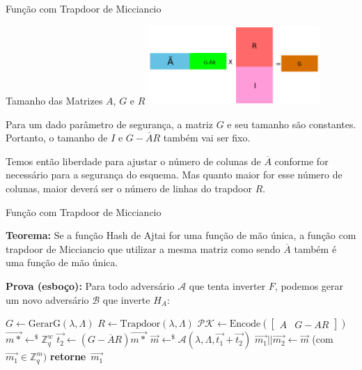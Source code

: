 \documentclass{beamer}
\begin{document}
\begin{frame}{Função com Trapdoor de Micciancio}

    \begin{block}{Tamanho das Matrizes $A$, $G$ e $R$}
    \includegraphics[height=3cm]{imagens/micciancio.png}
    
    Para um dado parâmetro de segurança, a matriz $G$ e seu tamanho são constantes. Portanto, o tamanho de $I$ e $G-\overline{A}R$ também vai ser fixo.
    
    Temos então liberdade para ajustar o número de colunas de $\overline{A}$ conforme for necessário para a segurança do esquema. Mas quanto maior for esse número de colunas, maior deverá ser o número de linhas do trapdoor $R$.
    \end{block}
    
\end{frame}

    \begin{frame}{Função com Trapdoor de Micciancio}

\textbf{Teorema: }Se a função Hash de Ajtai for uma função de mão única, a função com trapdoor de Micciancio que utilizar a mesma matriz como sendo $\overline{A}$ também é uma função de mão única.

    \textbf{Prova (esboço): }Para todo adversário $\mathcal{A}$ que tenta inverter $F$, podemos gerar um novo adversário $\mathcal{B}$ que inverte $H_A$:
    
    \begin{algorithm}[H]
    \SetAlgoLined
    $G \leftarrow \textrm{GerarG}(\lambda, \Lambda)$\;
    $R\leftarrow \textrm{Trapdoor}(\lambda, \Lambda)$\;
    $\mathcal{PK}\leftarrow \textrm{Encode}(\begin{bmatrix}A&G-AR\end{bmatrix})$\;
    $\overrightarrow{m*} \leftarrow^{\$} \mathbb{Z}_q^{w}$\;
    $\overrightarrow{t_2} \leftarrow (G-\overline{A}R)\overrightarrow{m*}$\;
    $\overrightarrow{m} \leftarrow^{\$}\mathcal{A}(\lambda, \Lambda, \overrightarrow{t_1}+\overrightarrow{t_2})$\;
    $\overrightarrow{m_1}||\overrightarrow{m_2} \leftarrow \overrightarrow{m}$ (\textrm{com}\   $\overrightarrow{m_1}\in\mathbb{Z}_q^m)$\;
    \textbf{retorne}\ $\overrightarrow{m_1}$\;
    \caption{Adversário $\mathcal{B}$ que inverte a Hash de Ajtai $H_A$}
\end{algorithm}

\end{frame}
\end{document}
